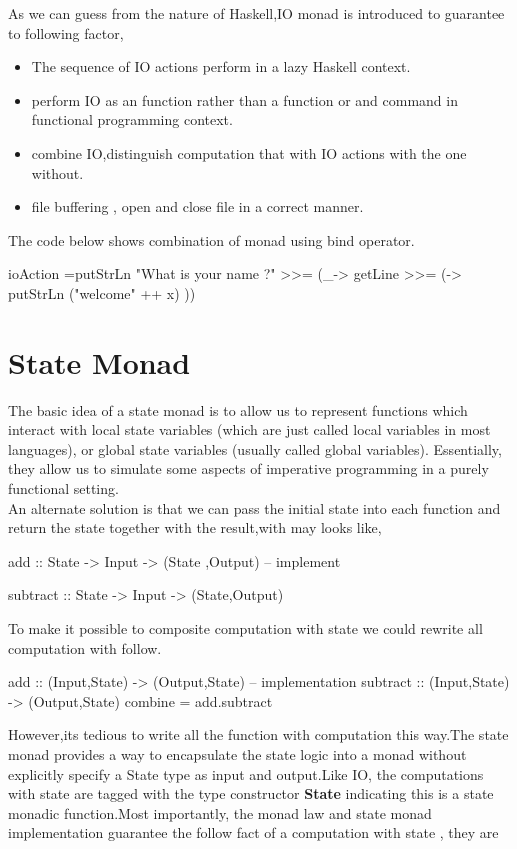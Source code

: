 As we can guess from the nature of Haskell,IO monad is introduced to guarantee to following factor,

\begin{itemize}
\item The sequence of IO actions perform in a lazy Haskell context.
\item perform IO as an function rather than a function or and command in functional programming context.
\item combine IO,distinguish computation that with IO actions with the one without.
\item  file buffering , open and close file in a correct manner.
\end{itemize}


The code below shows combination of monad using bind operator.
\begin{hcode}
ioAction 
  =putStrLn "What is your name ?"
	 >>= (_-> getLine >>= 
		(\x -> putStrLn ("welcome" ++ x) ))
\end{hcode}


\section{State Monad}
The basic idea of a state monad is to allow us to represent functions which interact with local state variables (which are just called local variables in most languages), or global state variables (usually called global variables). Essentially, they allow us to simulate some aspects of imperative programming in a purely functional setting.\\

An alternate solution is that we can pass the initial state into each function and return the state together with the result,with may looks like,
\begin{hcode}
add :: State -> Input -> (State ,Output)
-- implement

subtract :: State -> Input -> (State,Output)
\end{hcode}


To make it possible to composite computation with state we could rewrite all computation with follow.

\begin{hcode}
add :: (Input,State) -> (Output,State)
-- implementation 
subtract :: (Input,State) -> (Output,State)
combine = add.subtract 
\end{hcode}

However,its tedious to write all the function with computation this way.The state monad provides a way to encapsulate the state logic into a monad without explicitly specify a State type as input and output.Like IO, the computations with state  are tagged with the type constructor \textbf{State} indicating this is a state monadic function.Most importantly, the monad law and state monad implementation guarantee the follow fact of a computation with state , they are

